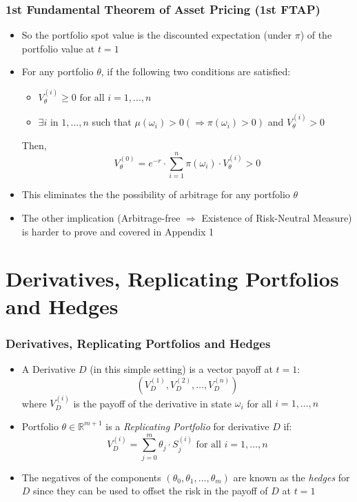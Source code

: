 \documentclass{beamer}
\begin{document}
\begin{frame}
\frametitle{1st Fundamental Theorem of Asset Pricing (1st FTAP)}
\begin{itemize}
\item So the portfolio spot value is the discounted expectation (under $\pi$) of the portfolio value at $t=1$
\item For any portfolio $\theta$, if the following two conditions are satisfied:
\begin{itemize}
\item $V_{\theta}^{(i)} \geq 0 \mbox{ for all } i = 1, \ldots,n$
\item $\exists i$ in $1, \ldots, n$ such that $\mu(\omega_i) > 0 (\Rightarrow \pi(\omega_i) > 0)$ and $V_{\theta}^{(i)} > 0$
\end{itemize}
Then, $$V_{\theta}^{(0)} = e^{-r} \cdot \sum_{i=1}^n \pi(\omega_i) \cdot V_{\theta}^{(i)} > 0$$
\item This eliminates the the possibility of arbitrage for any portfolio $\theta$
\item The other implication (Arbitrage-free $\Rightarrow$ Existence of Risk-Neutral Measure) is harder to prove and covered in Appendix 1
\end{itemize}
\end{frame}

\section{Derivatives, Replicating Portfolios and Hedges}

\begin{frame}
\frametitle{Derivatives, Replicating Portfolios and Hedges}
\begin{itemize}
\item A Derivative $D$ (in this simple setting) is a vector payoff at $t=1$:
$$(V_D^{(1)}, V_D^{(2)}, \ldots, V_D^{(n)})$$
where $V_D^{(i)}$ is the payoff of the derivative in state $\omega_i$ for all $i = 1, \ldots, n$
\item Portfolio $\theta \in \mathbb{R}^{m+1}$ is a {\em Replicating Portfolio} for derivative $D$ if:
\begin{equation}
V_D^{(i)} = \sum_{j=0}^m \theta_j \cdot S_j^{(i)} \mbox{ for all } i = 1, \ldots, n \label{eq:endreplport}
\end{equation}
\item The negatives of the components $(\theta_0, \theta_1, \ldots, \theta_m)$ are known as the {\em hedges} for $D$ since they can be used to offset 
the risk in the payoff of $D$ at $t=1$
\end{itemize}
\end{frame}
\end{document}

